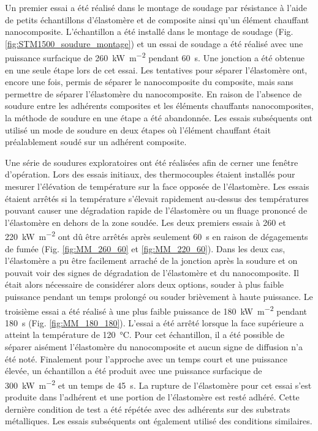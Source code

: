 Un premier essai a été réalisé dans le montage de soudage par résistance à l'aide de petits échantillons d'élastomère et de composite ainsi qu'un élément chauffant nanocomposite. 
L'échantillon a été installé dans le montage de soudage (Fig. \ref{fig:STM1500_soudure_montage}) et un essai de soudage a été réalisé avec une puissance surfacique de \SI{260}{\kilo\watt\per\square\metre} pendant \SI{60}{\second}. 
Une jonction a été obtenue en une seule étape lors de cet essai. 
Les tentatives pour séparer l'élastomère ont, encore une fois, permis de séparer le nanocomposite du composite, mais sans permettre de séparer l'élastomère du nanocomposite. 
En raison de l'absence de soudure entre les adhérents composites et les éléments chauffants nanocomposites, la méthode de soudure en une étape a été abandonnée.
Les essais subséquents ont utilisé un mode de soudure en deux étapes où l'élément chauffant était préalablement soudé sur un adhérent composite. 

Une série de soudures exploratoires ont été réalisées afin de cerner une fenêtre d'opération. 
Lors des essais initiaux, des thermocouples étaient installés pour mesurer l'élévation de température sur la face opposée de l'élastomère. 
Les essais étaient arrêtés si la température s'élevait rapidement au-dessus des températures pouvant causer une dégradation rapide de l'élastomère ou un fluage prononcé de l'élastomère en dehors de la zone soudée. 
Les deux premiers essais à 260 et \SI{220}{\kilo\watt\per\square\metre} ont dû être arrêtés après seulement \SI{60}{\second} en raison de dégagements de fumée (Fig. \ref{fig:MM_260_60} et \ref{fig:MM_220_60}). 
Dans les deux cas, l'élastomère a pu être facilement arraché de la jonction après la soudure et on pouvait voir des signes de dégradation de l'élastomère et du nanocomposite. 
Il était alors nécessaire de considérer alors deux options, souder à plus faible puissance pendant un temps prolongé ou souder brièvement à haute puissance. 
Le troisième essai a été réalisé à une plus faible puissance de \SI{180}{\kilo\watt\per\square\metre} pendant \SI{180}{\second} (Fig. \ref{fig:MM_180_180}). 
L'essai a été arrêté lorsque la face supérieure a atteint la température de \SI{120}{\celsius}. 
Pour cet échantillon, il a été possible de séparer aisément l'élastomère du nanocomposite et aucun signe de diffusion n'a été noté. 
Finalement pour l'approche avec un temps court et une puissance élevée, un échantillon a été produit avec une puissance surfacique de \SI{300}{\kilo\watt\per\square\metre} et un temps de \SI{45}{\second}. 
La rupture de l'élastomère pour cet essai s'est produite dans l'adhérent et une portion de l'élastomère est resté adhéré. 
Cette dernière condition de test a été répétée avec des adhérents sur des substrats métalliques. 
Les essais subséquents ont également utilisé des conditions similaires. 


